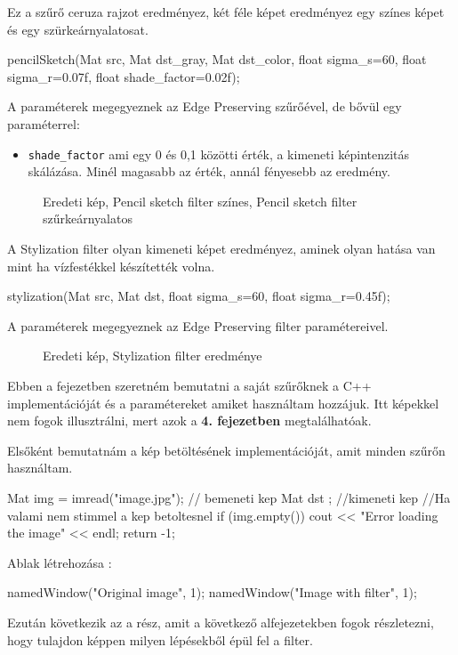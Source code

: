 
Ez a szűrő ceruza rajzot eredményez, két féle képet eredményez egy színes képet és egy szürkeárnyalatosat.
\begin{cpp}
pencilSketch(Mat src, Mat dst_gray, Mat dst_color, float sigma_s=60, 
		float sigma_r=0.07f, float shade_factor=0.02f);
\end{cpp}

A paraméterek megegyeznek az Edge Preserving szűrőével, de bővül egy paraméterrel:
\begin{itemize}
    \item \texttt{shade\_factor} ami egy 0 és 0,1 közötti érték, a kimeneti képintenzitás skálázása. Minél magasabb az érték, annál fényesebb az eredmény.
\end{itemize}

\begin{figure}[ht]
\centering
{}
\caption{Eredeti kép, Pencil sketch filter színes, Pencil sketch filter szűrkeárnyalatos} 
\label{fig:pencil_sketch_color_grey}
\end{figure}


A Stylization filter olyan kimeneti képet eredményez, aminek olyan hatása van mint ha vízfestékkel készítették volna.
\begin{cpp}
stylization(Mat src, Mat dst, float sigma_s=60, float sigma_r=0.45f);
\end{cpp}
A paraméterek megegyeznek az Edge Preserving filter paramétereivel. 

\begin{figure}[ht]
\centering
{}
\caption{Eredeti kép, Stylization filter eredménye} 
\label{fig:stylization}
\end{figure}




Ebben a fejezetben szeretném bemutatni a saját szűrőknek a C++ implementációját és a paramétereket amiket használtam hozzájuk. Itt képekkel nem fogok illusztrálni, mert azok a \textbf{4. fejezetben} megtalálhatóak.

Elsőként bemutatnám a kép betöltésének implementációját, amit minden szűrőn használtam.
\begin{cpp}
Mat img = imread("image.jpg"); // bemeneti kep
Mat dst ; //kimeneti kep
//Ha valami nem stimmel a kep betoltesnel
if (img.empty()) {
    cout << "Error loading the image" << endl;
    return -1;
}
\end{cpp} 
Ablak létrehozása :
\begin{cpp}
namedWindow("Original image", 1);
namedWindow("Image with filter", 1);
\end{cpp}
Ezután következik az a rész, amit a következő alfejezetekben fogok részletezni, hogy tulajdon képpen milyen lépésekből épül fel a filter.


